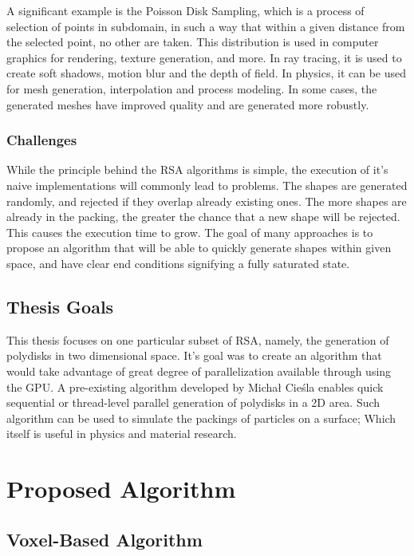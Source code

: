 \documentclass[12pt, oneside]{report}
\begin{document}
A significant example is the Poisson Disk Sampling, which is a process of selection of points in subdomain, in such a way that within a given distance from the selected point, no other are taken. This distribution is used in computer graphics for rendering, texture generation, and more. In ray tracing, it is used to create soft shadows, motion blur and the depth of field. In physics, it can be used for mesh generation, interpolation and process modeling. In some cases, the generated meshes have improved quality and are generated more robustly\cite{ebeida}.

\subsection {Challenges}

While the principle behind the RSA algorithms is simple, the execution of it's naive implementations will commonly lead to problems. The shapes are generated randomly, and rejected if they overlap already existing ones. The more shapes are already in the packing, the greater the chance that a new shape will be rejected. This causes the execution time to grow. The goal of many approaches is to propose an algorithm that will be able to quickly generate shapes within given space, and have clear end conditions signifying a fully saturated state.

\section {Thesis Goals}

This thesis focuses on one particular subset of RSA, namely, the generation of polydisks in two dimensional space. It's goal was to create an algorithm that would take advantage of great degree of parallelization available through using the GPU. A pre-existing algorithm developed by Michał Cieśla enables quick sequential or thread-level parallel generation of polydisks in a 2D area. Such algorithm can be used to simulate the packings of particles on a surface; Which itself is useful in physics and material research\cite{ciesla}.


\chapter{Proposed Algorithm}

\section {Voxel-Based Algorithm}
\end{document}

